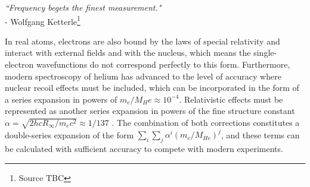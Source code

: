 \begin{adjustwidth}{4cm}{0cm}
\begin{flushright}
\emph{``Frequency begets the finest measurement."\\} 
- Wolfgang Ketterle\footnote{Source TBC}
\end{flushright}
\end{adjustwidth}



In real atoms, electrons are also bound by the laws of special relativity and interact with external fields and with the nucleus, which means the single-electron wavefunctions do not correspond perfectly to this form.
	Furthermore, modern spectroscopy of helium has advanced to the level of accuracy where nuclear recoil effects must be included, which can be incorporated in the form of a series expansion in powers of  $m_e/M_He\approx10^{-4}$.
	Relativistic effects must be represented as another series expansion in powers of the fine structure constant $\alpha=\sqrt{2h c R_\infty/m_e c^2}\approx1/137$ .
	The combination of both corrections constitutes a double-series expansion of the form $\sum_i\sum_j \alpha^i(m_e/M_{He})^j$, and these terms can be calculated with sufficient accuracy to compete with modern experiments.




